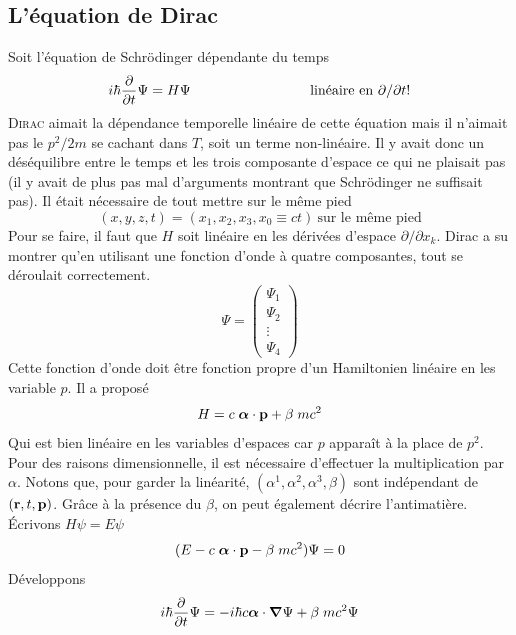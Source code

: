 \subsection{L'équation de Dirac}
Soit l'équation de Schrödinger dépendante du temps
\begin{equation}
i \hbar \frac{\partial}{\partial t} \Psi = H \Psi 
\hspace*{3cm} \mbox{lin\'eaire en}~\partial/\partial t !
\end{equation}
\textsc{Dirac} aimait la dépendance temporelle linéaire de cette équation mais il n'aimait pas le 
$p^2/2m$ se cachant dans $T$, soit un terme non-linéaire. Il y avait donc un déséquilibre entre 
le temps et les trois composante d'espace ce qui ne plaisait pas (il y avait de plus pas mal 
d'arguments montrant que Schrödinger ne suffisait pas). Il était nécessaire de tout mettre sur
le même pied
\begin{equation}
(x,y,z,t) = (x_1,x_2,x_3, x_0 \equiv ct) ~\mbox{sur le m\^eme pied}
\end{equation}
Pour se faire, il faut que $H$ soit linéaire en les dérivées d'espace $\partial/\partial x_k$. 
Dirac a su montrer qu'en utilisant une fonction d'onde à quatre composantes, tout se déroulait 
correctement.
\begin{equation}
\Psi = \left(
\begin{array}{c} \Psi_1 \\ \Psi_2 \\ \vdots \\ 
\Psi_4 \end{array}
\right)
\end{equation}
Cette fonction d'onde doit être fonction propre d'un Hamiltonien linéaire en les variable $p$. Il a 
proposé
\begin{equation}
H = c \; \mbox{\boldmath $ \alpha $} \cdot {\bf p}
  + \beta \; mc^2
\end{equation}
Qui est bien linéaire en les variables d'espaces car $p$ apparaît à la place de $p^2$. Pour des raisons
dimensionnelle, il est nécessaire d'effectuer la multiplication par $\alpha$. Notons que, pour garder
la linéarité, $(\alpha^1, \alpha^2, \alpha^3, \beta)$ sont indépendant de $({\bf r},t,{\bf p})$. Grâce
à la présence du $\beta$, on peut également décrire l'antimatière. Écrivons $H\psi = E\psi$
\begin{equation}
(E - c \; \mbox{\boldmath $ \alpha $} \cdot {\bf p}
  - \beta \; mc^2 ) \Psi = 0
\end{equation}
Développons
\begin{equation}
i \hbar \frac{\partial}{\partial t} \Psi =
- i \hbar  c \mbox{\boldmath $ \alpha $} \cdot \mbox{\boldmath $ \nabla $} \Psi +  \beta \; mc^2  \Psi
\end{equation}
